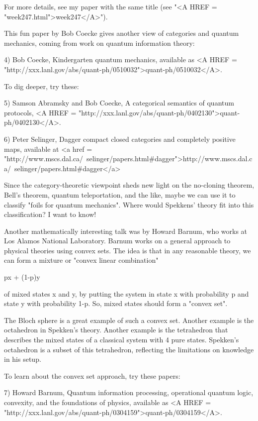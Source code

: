 For more details, see my paper with the same title (see "<A HREF
= "week247.html">week247</A>").  

This fun paper by Bob Coecke gives another view of categories and
quantum mechanics, coming from work on quantum information theory:

4) Bob Coecke, Kindergarten quantum mechanics, available as 
<A HREF = "http://xxx.lanl.gov/abs/quant-ph/0510032">quant-ph/0510032</A>.

To dig deeper, try these:

5) Samson Abramsky and Bob Coecke, A categorical semantics of quantum
protocols, <A HREF =
"http://xxx.lanl.gov/abs/quant-ph/0402130">quant-ph/0402130</A>.
 
6) Peter Selinger, Dagger compact closed categories and completely 
positive maps, available at 
<a href = "http://www.mscs.dal.ca/~selinger/papers.html#dagger">http://www.mscs.dal.ca/~selinger/papers.html#dagger</a>

Since the category-theoretic viewpoint sheds new light on the
no-cloning theorem, Bell's theorem, quantum teleportation, and the
like, maybe we can use it to classify "foils for quantum
mechanics".  Where would Spekkens' theory fit into this
classification?  I want to know!

Another mathematically interesting talk was by Howard Barnum, 
who works at Los Alamos National Laboratory.  Barnum works on a general
approach to physical theories using convex sets.  The idea is that 
in any reasonable theory, we can form a mixture or "convex linear 
combination" 

px + (1-p)y

of mixed states x and y, by putting the system in state x with
probability p and state y with probability 1-p.  So, mixed states
should form a "convex set".

The Bloch sphere is a great example of such a convex set.  Another 
example is the octahedron in Spekken's theory.  Another example is
the tetrahedron that describes the mixed states of a classical 
system with 4 pure states.  Spekken's octahedron is a subset of 
this tetrahedron, reflecting the limitations on knowledge in his 
setup.  

To learn about the convex set approach, try these papers:

7) Howard Barnum, Quantum information processing, operational 
quantum logic, convexity, and the foundations of physics, available
as <A HREF = "http://xxx.lanl.gov/abs/quant-ph/0304159">quant-ph/0304159</A>.

